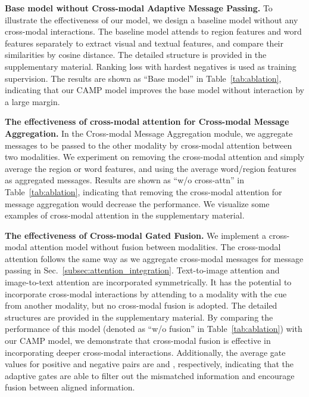 \documentclass[10pt,twocolumn,letterpaper]{article}
\begin{document}
\noindent\textbf{Base model without Cross-modal Adaptive Message Passing.}
To illustrate the effectiveness of our model, we design a baseline model without any cross-modal interactions.
The baseline model attends to region features and word features separately to extract visual and textual features, and compare their similarities by cosine distance. The detailed structure is provided in the supplementary material.
Ranking loss with hardest negatives is used as training supervision.
The results are shown as ``Base model'' in Table~\ref{tab:ablation}, indicating that our CAMP model improves the base model without interaction by a large margin.

\noindent\textbf{The effectiveness of cross-modal attention for Cross-modal Message Aggregation.}
In the Cross-modal Message Aggregation module, we aggregate messages to be passed to the other modality by cross-modal attention between two modalities. 
We experiment on removing the cross-modal attention and simply average the region or word features, and using the average word/region features as aggregated messages.
Results are shown as ``w/o cross-attn'' in Table~\ref{tab:ablation}, indicating that removing the cross-modal attention for message aggregation would decrease the performance.
We visualize some examples of cross-modal attention in the supplementary material.

\noindent\textbf{The effectiveness of Cross-modal Gated Fusion.}
We implement a cross-modal attention model without fusion between modalities. 
The cross-modal attention follows the same way as we aggregate cross-modal messages for message passing in Sec.~\ref{subsec:attention_integration}.
Text-to-image attention and image-to-text attention are incorporated symmetrically.
It has the potential to incorporate cross-modal interactions by attending to a modality with the cue from another modality, but no cross-modal fusion is adopted.
The detailed structures are provided in the supplementary material.
By comparing the performance of this model (denoted as ``w/o fusion'' in Table~\ref{tab:ablation}) with our CAMP model, we demonstrate that cross-modal fusion is effective in incorporating deeper cross-modal interactions.
Additionally, the average gate values for positive and negative pairs are  and , respectively, indicating that the adaptive gates are able to filter out the mismatched information and encourage fusion between aligned information.
\end{document}

